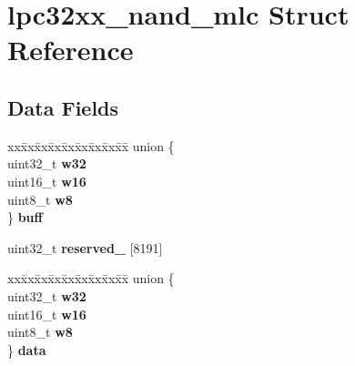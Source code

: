 \hypertarget{structlpc32xx__nand__mlc}{}\section{lpc32xx\+\_\+nand\+\_\+mlc Struct Reference}
\label{structlpc32xx__nand__mlc}
\subsection*{Data Fields}
\begin{DoxyCompactItemize}
\item 
\mbox{\label{structlpc32xx__nand__mlc_a5e23d885fa001b98eb6497b4e7c91b6b}} 
\begin{tabbing}
xx\=xx\=xx\=xx\=xx\=xx\=xx\=xx\=xx\=\kill
union \{\\
\>uint32\_t {\bfseries w32}\\
\>uint16\_t {\bfseries w16}\\
\>uint8\_t {\bfseries w8}\\
\} {\bfseries buff}\\

\end{tabbing}\item 
\mbox{\label{structlpc32xx__nand__mlc_a805745184300442988fb2c16104c1337}} 
uint32\+\_\+t {\bfseries reserved\+\_} \mbox{[}8191\mbox{]}
\item 
\mbox{\label{structlpc32xx__nand__mlc_a43585786f272855da33a36ec67b94dbf}} 
\begin{tabbing}
xx\=xx\=xx\=xx\=xx\=xx\=xx\=xx\=xx\=\kill
union \{\\
\>uint32\_t {\bfseries w32}\\
\>uint16\_t {\bfseries w16}\\
\>uint8\_t {\bfseries w8}\\
\} {\bfseries data}\\


\end{tabbing}
\end{DoxyCompactItemize}
